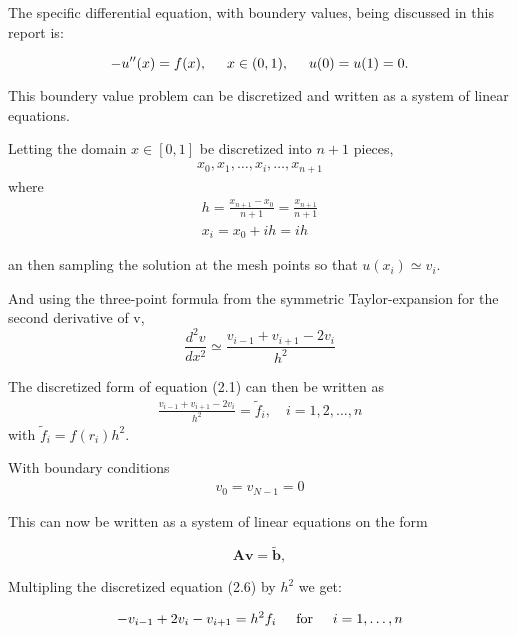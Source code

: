 \documentclass[11pt,a4paper,english,draft]{article}
\numberwithin{equation}{section}
\newcommand{\ve}[1]{\mathbf{#1}} %
\newcommand{\spac}{\hspace{5mm}}
\begin{document}
The specific differential equation, with boundery values, being discussed in this report is: 

\begin{equation}
-u''(x) = f(x), \spac x \in (0,1), \spac u(0) = u(1) = 0.
\end{equation}

This boundery value problem can be discretized and written as a system of linear equations.

Letting the domain $x \in [0,1]$ be discretized into $n+1$ pieces,
\begin{gather}
x_0, x_1, \dots, x_i, \dots, x_{n+1}
\end{gather}
where 
\begin{gather}
h = \frac{x_{n+1} - x_0}{n+1} = \frac{x_{n+1}}{n+1}\\
x_i = x_0 + ih = ih
\end{gather}

an then sampling the solution at the mesh points so that $u(x_i) \simeq v_i$.

And using the three-point formula from the symmetric 
Taylor-expansion for the second derivative of v,
\begin{equation}
\frac{d^2v}{dx^2} \simeq \frac{v_{i-1} + v_{i+1} - 2v_i}{h^2}
\end{equation}

The discretized form of equation (2.1) can then be written as
\begin{gather}
\frac{v_{i-1} + v_{i+1} - 2v_i}{h^2} = \tilde{f}_i , \quad i=1,2, \dots, n 
\end{gather}
with $\tilde{f}_i = f(r_i) h^2$.

With boundary conditions 
\begin{gather}
v_0 = v_{N-1} = 0
\end{gather}

This can now be written as a system of linear equations on the form 

\begin{equation}
   \ve{A}\ve{v} = \tilde{\ve{b}},
   \label{eq:Avb}
\end{equation}

Multipling the discretized equation (2.6) by $h^2$ we get:

\begin{gather*}
   -v_{i-1}+2v_{i}-v_{i+1}=h^2 f_i \hspace{0.5cm} \mathrm{for} \hspace{0.5cm} i=1,\dots, n 
\end{gather*}
\end{document}
